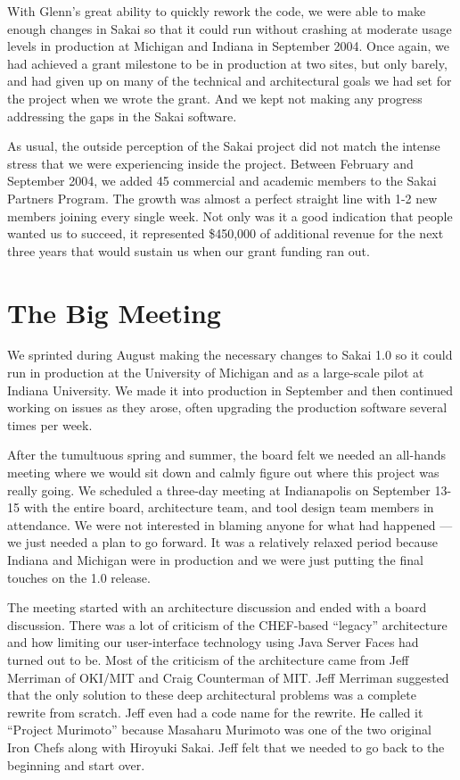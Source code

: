 \documentclass[12pt]{book}
\begin{document}
With Glenn's great ability to quickly rework
the code, we were able to make enough changes
in Sakai so that it could run without crashing
at moderate usage levels in production
at Michigan and Indiana in September 2004.
Once again, we had achieved a grant milestone
to be in production at two sites,
but only barely, and had given up on many
of the technical and architectural
goals we had set for the project when we wrote the grant.
And we kept not making any progress addressing
the gaps in the Sakai software.

As usual, the outside perception of the
Sakai project did not match the intense stress
that we were experiencing inside the project.
Between February and September 2004, we added
45 commercial and academic members to the Sakai
Partners Program.  The growth was almost a
perfect straight line with 1-2 new members joining
every single week.  Not only was it a good
indication that people wanted us to succeed,
it represented \$450,000 of additional revenue
for the next three years that would sustain us
when our grant funding ran out.

\chapter{The Big Meeting}

We sprinted during August making the necessary changes
to Sakai 1.0 so it could run in production at the
University of Michigan and as a large-scale pilot
at Indiana University.  We made it into production
in September and then continued working on issues as they
arose, often upgrading the production software several
times per week.

After the tumultuous spring and summer, the board felt we
needed an all-hands meeting where we would sit down
and calmly figure out where this project was really going.
We scheduled a three-day meeting at Indianapolis
on September 13-15 with the entire board, architecture team,
and tool design team members in attendance.  We were not
interested in blaming anyone for what had happened --- we
just needed a plan to go forward. It was a relatively
relaxed period because Indiana and Michigan were in
production and we were just putting the final touches on
the 1.0 release.

The meeting started with an architecture discussion and
ended with a board discussion.  There was a lot of criticism
of the CHEF-based ``legacy'' architecture and how limiting
our user-interface technology using Java Server Faces
had turned out to be.  Most of the criticism of
the architecture came from Jeff Merriman of OKI\slash MIT and
Craig Counterman of MIT.
Jeff Merriman suggested that the only solution to these
deep architectural problems was a complete rewrite
from scratch.  Jeff even had a code name for the rewrite.
He called it ``Project Murimoto'' because Masaharu Murimoto
was one of the two original Iron Chefs along with
Hiroyuki Sakai.  Jeff felt that we needed to go back to
the beginning and start over.
\end{document}

